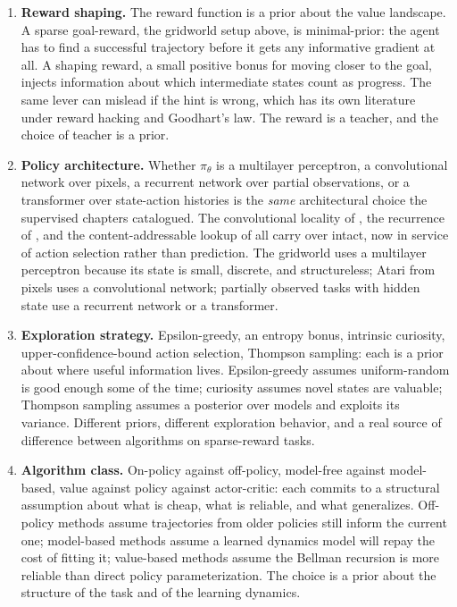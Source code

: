 \begin{enumerate}
\item \textbf{Reward shaping.} The reward function is a prior about the value
landscape. A sparse goal-reward, the gridworld setup above, is minimal-prior:
the agent has to find a successful trajectory before it gets any informative
gradient at all. A shaping reward, a small positive bonus for moving closer to
the goal, injects information about which intermediate states count as
progress. The same lever can mislead if the hint is wrong, which has its own
literature under reward hacking and Goodhart's law. The reward is a teacher,
and the choice of teacher is a prior.
\item \textbf{Policy architecture.} Whether $\pi_\theta$ is a multilayer
perceptron, a convolutional network over pixels, a recurrent network over
partial observations, or a transformer over state-action histories is the
\emph{same} architectural choice the supervised chapters catalogued. The
convolutional locality of , the recurrence of , and
the content-addressable lookup of  all carry over intact,
now in service of action selection rather than prediction. The gridworld uses
a multilayer perceptron because its state is small, discrete, and structureless;
Atari from pixels uses a convolutional network; partially observed tasks with
hidden state use a recurrent network or a transformer.
\item \textbf{Exploration strategy.} Epsilon-greedy, an entropy bonus,
intrinsic curiosity, upper-confidence-bound action selection, Thompson
sampling: each is a prior about where useful information lives. Epsilon-greedy
assumes uniform-random is good enough some of the time; curiosity assumes novel
states are valuable; Thompson sampling assumes a posterior over models and
exploits its variance. Different priors, different exploration behavior, and a
real source of difference between algorithms on sparse-reward tasks.
\item \textbf{Algorithm class.} On-policy against off-policy, model-free
against model-based, value against policy against actor-critic: each commits to
a structural assumption about what is cheap, what is reliable, and what
generalizes. Off-policy methods assume trajectories from older policies still
inform the current one; model-based methods assume a learned dynamics model
will repay the cost of fitting it; value-based methods assume the Bellman
recursion is more reliable than direct policy parameterization. The choice is a
prior about the structure of the task and of the learning dynamics.
\end{enumerate}

